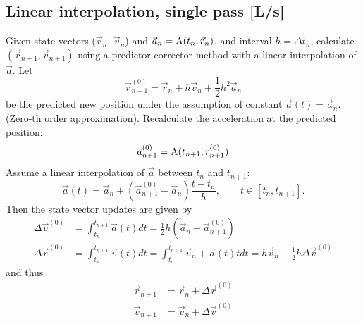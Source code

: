 \documentclass[a4paper]{article}
\begin{document}
\subsection{Linear interpolation, single pass [L/s]}
Given state vectors ($\vec{r}_n$, $\vec{v}_n$) and $\vec{a}_n = \mathrm{A}(t_n,\vec{r}_n)$, and interval $h=\Delta t_n$, calculate $(\vec{r}_{n+1},\vec{v}_{n+1})$ using a predictor-corrector method with a linear interpolation of $\vec{a}$.
Let
\begin{equation*}
\vec{r}_{n+1}^{(0)} = \vec{r}_n + h\vec{v}_n + \frac{1}{2} h^2\vec{a}_n
\end{equation*}
be the predicted new position under the assumption of constant $\vec{a}(t) = \vec{a}_n$. (Zero-th order approximation).
Recalculate the acceleration at the predicted position:
\begin{equation*}
\vec{a}_{n+1}^{(0)} = \mathrm{A}(t_{n+1},\vec{r}_{n+1}^{(0)})
\end{equation*}
Assume a linear interpolation of $\vec{a}$ between $t_n$ and $t_{n+1}$:
\begin{equation*}
\vec{a}(t) = \vec{a}_n + (\vec{a}_{n+1}^{(0)}-\vec{a}_n)\frac{t-t_n}{h},
\qquad t \in [t_n, t_{n+1}].
\end{equation*}
Then the state vector updates are given by
\begin{equation}
\begin{split}
\Delta\vec{v}^{(0)} &= \int_{t_n}^{t_{n+1}} \vec{a}(t) dt = \frac{1}{2}h (\vec{a}_n+\vec{a}_{n+1}^{(0)}) \\
\Delta\vec{r}^{(0)} &= \int_{t_n}^{t_{n+1}} \vec{v}(t) dt = \int_{t_n}^{t_{n+1}} \vec{v}_n + \vec{a}(t)t dt = h\vec{v}_n + \frac{1}{2}h\Delta\vec{v}^{(0)} \label{eq:lin_pos_upd}
\end{split}
\end{equation}
and thus
\begin{equation*}
\begin{split}
\vec{r}_{n+1} &= \vec{r}_n + \Delta\vec{r}^{(0)} \\
\vec{v}_{n+1} &= \vec{v}_n + \Delta\vec{v}^{(0)}
\end{split}
\end{equation*}
\end{document}
